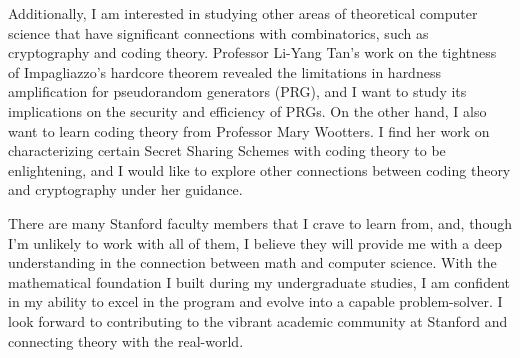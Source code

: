 \documentclass[12pt]{article}
\begin{document}
Additionally, I am interested in studying other areas of theoretical computer science that have
significant connections with combinatorics, such as cryptography and coding theory. Professor
Li-Yang Tan's work on the tightness of Impagliazzo's hardcore theorem
\cite{blanc2024samplecomplexitysmoothboosting} revealed the limitations in hardness amplification
for pseudorandom generators (PRG), and I want to study its implications on the security and
efficiency of PRGs. On the other hand, I also want to learn coding theory from Professor Mary
Wootters. I find her work on characterizing certain Secret Sharing Schemes with coding
theory\cite{blackwell2023characterizationoptimalratelinearhomomorphic} to be enlightening, and I
would like to explore other connections between coding theory and cryptography under her guidance.

There are many Stanford faculty members that I crave to learn from, and, though I'm unlikely to work
with all of them, I believe they will provide me with a deep understanding in the connection between
math and computer science. With the mathematical foundation I built during my undergraduate studies,
I am confident in my ability to excel in the program and evolve into a capable problem-solver. I
look forward to contributing to the vibrant academic community at Stanford and connecting theory
with the real-world.

\newpage



\end{document}
